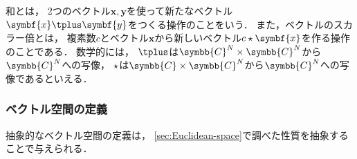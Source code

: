 \documentclass[
]{sotsu}
\begin{document}
和とは，
2つのベクトル$\symbf{x}, \symbf{y}$を使って新たなベクトル$\symbf{x} \vecplus \symbf{y}$をつくる操作のことをいう．
また，ベクトルのスカラー倍とは，
複素数$c$とベクトル$\symbf{x}$から新しいベクトル$c \scaprod \symbf{x}$を作る操作のことである．
数学的には，
$\vecplus$は$\symbb{C}^N \times \symbb{C}^N$から$\symbb{C}^N$への写像，
$\mathbin{\star}$は$\symbb{C} \times \symbb{C}^N$から$\symbb{C}^N$への写像であるといえる．



\subsubsection{ベクトル空間の定義}
\label{sec:definition-of-vector-space}

抽象的なベクトル空間の定義は，
\cref{sec:Euclidean-space}で調べた性質を抽象することで与えられる．
\end{document}
